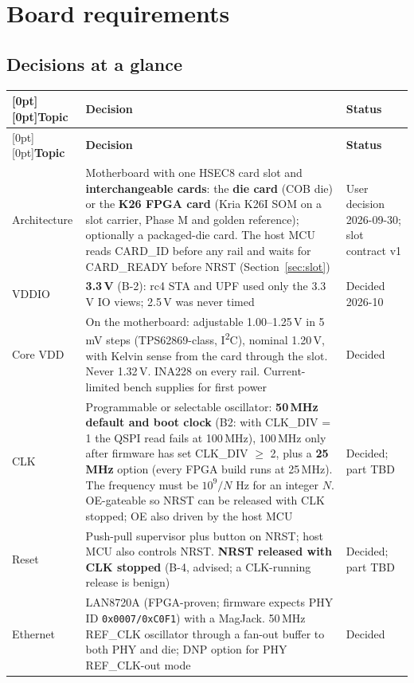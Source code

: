 \documentclass[10pt,a4paper]{article}
\newcommand\hd[1]{\textbf{#1}}
\begin{document}
\section{Board requirements}\label{sec:board}
\subsection{Decisions at a glance}
{\small
\begin{longtable}{@{}P{2.6cm}P{10.0cm}P{3.4cm}@{}}
\toprule
{}[0pt][0pt]\hd{Topic} & \hd{Decision} & \hd{Status}\\
\midrule
\endfirsthead
\toprule
{}[0pt][0pt]\hd{Topic} & \hd{Decision} & \hd{Status}\\
\midrule
\endhead
Architecture & Motherboard with one HSEC8 card slot and \textbf{interchangeable cards}: the \textbf{die card} (COB die) or the \textbf{K26 FPGA card} (Kria K26I SOM on a slot carrier, Phase M and golden reference); optionally a packaged-die card. The host MCU reads CARD\_ID before any rail and waits for CARD\_READY before NRST (Section~\ref{sec:slot}) & User decision 2026-09-30; slot contract v1 \\
VDDIO & \textbf{3.3\,V} (B-2): rc4 STA and UPF used only the 3.3\,V IO views; 2.5\,V was never timed & Decided 2026-10 \\
Core VDD & On the motherboard: adjustable 1.00--1.25\,V in 5\,mV steps (TPS62869-class, I\textsuperscript{2}C), nominal 1.20\,V, with Kelvin sense from the card through the slot. Never 1.32\,V. INA228 on every rail. Current-limited bench supplies for first power & Decided \\
CLK & Programmable or selectable oscillator: \textbf{50\,MHz default and boot clock} (B2: with CLK\_DIV = 1 the QSPI read fails at 100\,MHz), 100\,MHz only after firmware has set CLK\_DIV $\ge$ 2, plus a \textbf{25\,MHz} option (every FPGA build runs at 25\,MHz). The frequency must be $10^9/N$ Hz for an integer $N$. OE-gateable so NRST can be released with CLK stopped; OE also driven by the host MCU & Decided; part TBD \\
Reset & Push-pull supervisor plus button on NRST; host MCU also controls NRST. \textbf{NRST released with CLK stopped} (B-4, advised; a CLK-running release is benign) & Decided; part TBD \\
Ethernet & LAN8720A (FPGA-proven; firmware expects PHY ID \texttt{0x0007/0xC0F1}) with a MagJack. 50\,MHz REF\_CLK oscillator through a fan-out buffer to both PHY and die; DNP option for PHY REF\_CLK-out mode & Decided \\

\end{longtable}}
\end{document}
